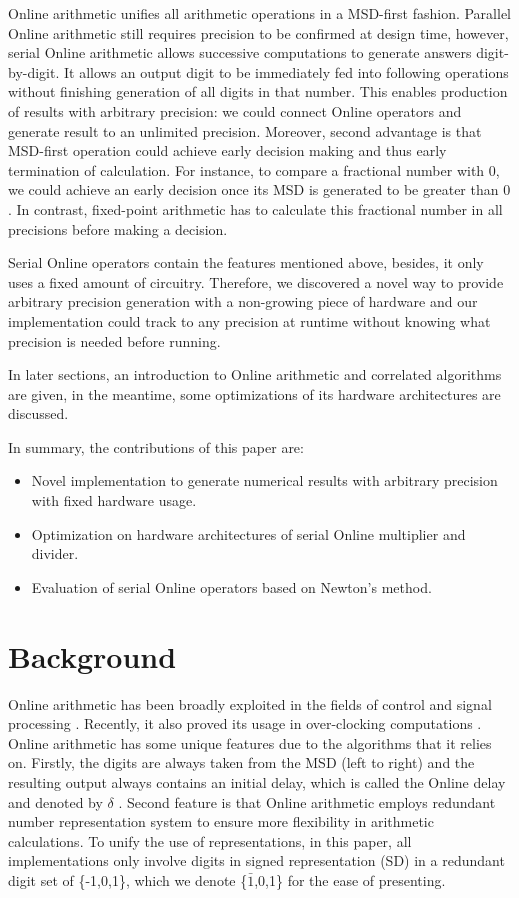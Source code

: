 \documentclass{sig-alternate}
\begin{document}
	Online arithmetic unifies all arithmetic operations in a MSD-first fashion. Parallel Online arithmetic still requires precision to be confirmed at design time, however, serial Online arithmetic allows successive computations to generate answers digit-by-digit. It allows an output digit to be immediately fed into following operations without finishing generation of all digits in that number. This enables production of results with arbitrary precision: we could connect Online operators and generate result to an unlimited precision. Moreover, second advantage is that MSD-first operation could achieve early decision making and thus early termination of calculation. For instance, to compare a fractional number with $0$, we could achieve an early decision once its MSD is generated to be greater than $0$. In contrast, fixed-point arithmetic has to calculate this fractional number in all precisions before making a decision.
	
	Serial Online operators contain the features mentioned above, besides, it only uses a fixed amount of circuitry. Therefore, we discovered a novel way to provide arbitrary precision generation with a non-growing piece of hardware and our implementation could track to any precision at runtime without knowing what precision is needed before running.   
	
	In later sections, an introduction to Online arithmetic and correlated algorithms are given, in the meantime, some optimizations of its hardware architectures are discussed.
	
	In summary, the contributions of this paper are:
	\begin{itemize}
		\item Novel implementation to generate numerical results with arbitrary precision with fixed hardware usage.
		\item Optimization on hardware architectures of serial Online multiplier and divider.
		\item Evaluation of serial Online operators based on Newton's method.   
	\end{itemize}
		
	\section{Background}
	Online arithmetic has been broadly exploited in the fields of control and signal processing \cite{online_control}\cite{online_signal_processing}. Recently, it also proved its usage in over-clocking computations \cite{Kan_overclocking}. Online arithmetic has some unique features due to the algorithms that it relies on. Firstly, the digits are always taken from the MSD (left to right) and the resulting output always contains an initial delay, which is called the Online delay and denoted by $\delta$ \cite{digital_arithmetic_book}. Second feature is that Online arithmetic employs redundant number representation system to ensure more flexibility in arithmetic calculations. To unify the use of representations, in this paper, all implementations only involve digits in signed representation (SD) in a redundant digit set of \{-1,0,1\}, which we denote \{$\bar{1}$,0,1\} for the ease of presenting. 
	
\end{document}
